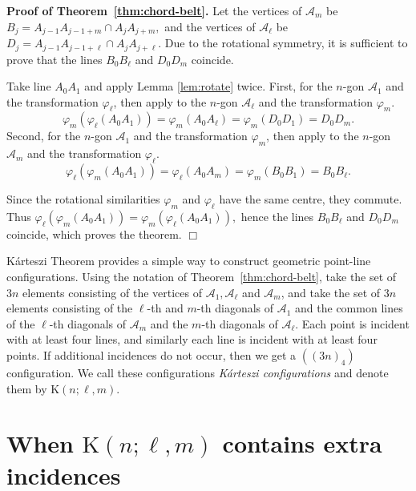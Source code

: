 \documentclass[12pt]{article}
\theoremstyle{definition} \newtheorem*{definition}              {Definition}
\theoremstyle{definition} \newtheorem {remark}                   {Remark}
\theoremstyle{definition} \newtheorem*{problem}                {Problem}
\theoremstyle{definition} \newtheorem{example}     [thm]{Example}
\begin{document}
\smallskip

\noindent
{\bf Proof of Theorem~\ref{thm:chord-belt}.}
Let the vertices of $\mathcal{A}_m$ be
$B_j=A_{j-1}A_{j-1+m}\cap A_jA_{j+m},$ and the vertices of $\mathcal{A}_{\ell }$ 
be $D_j=A_{j-1}A_{j-1+\ell }\cap A_jA_{j+\ell }.$ Due to the rotational symmetry, it is sufficient to prove that the 
lines $B_0B_{\ell }$ and $D_0D_m$ coincide.

Take line $A_0A_1$ and apply Lemma \ref{lem:rotate} twice. 
First, for the $n$-gon $\mathcal{A}_1$ and the transformation $\varphi _{\ell}$, then apply to the $n$-gon 
$\mathcal{A}_{\ell }$ and the transformation $\varphi _m$. 
$$\varphi _{m}(\varphi _{\ell }(A_0A_1))=\varphi _{m}(A_0A_{\ell })=
\varphi _{m}(D_0D_{1})=D_0D_m.$$ 
Second, for the $n$-gon $\mathcal{A}_1$ and the transformation $\varphi _{m}$, then apply to the $n$-gon 
$\mathcal{A}_{m}$ and the transformation $\varphi _{\ell }$. 
$$
\varphi _{\ell }(\varphi _{m}(A_0A_1))=\varphi _{\ell }(A_0A_{m})=
\varphi _{m}(B_0B_{1})=B_0B_{\ell }.
$$ 

Since the rotational 
similarities $\varphi _m$ and $\varphi _{\ell}$ have the same centre, they commute. Thus
$\varphi _{\ell }(\varphi _{m}(A_0A_1))=\varphi _{m}(\varphi _{\ell }(A_0A_1)),$ hence
the lines $B_0B_{\ell }$ and $D_0D_m$ coincide, which proves the theorem.
\hfill{$\Box $}

\smallskip

Kárteszi Theorem provides a simple way to construct geometric point-line configurations. 
Using the notation of Theorem~\ref{thm:chord-belt}, take the set of $3n$ elements consisting 
of the vertices of $\mathcal{A}_{1}, \mathcal{A}_{\ell}$ and $\mathcal{A}_{m}$, and take the 
set of  $3n$ elements consisting of the $\ell$-th and $m$-th  diagonals of $\mathcal{A}_{1}$ and 
the common lines of the $\ell$-th diagonals of $\mathcal{A}_m$ and the $m$-th  diagonals of $\mathcal{A}_{\ell }$. 
Each point is incident with at least four lines, and similarly each line is incident with at least 
four points. If additional incidences do not occur, then we get a $((3n)_4)$ configuration. We call 
these configurations \emph{Kárteszi configurations} and denote them by $\mathrm{K}(n;\ell ,m)$.




\section{When $\mathrm{K}(n;\ell,m)$ contains extra incidences} \label{sect:exceptional}
\end{document}
